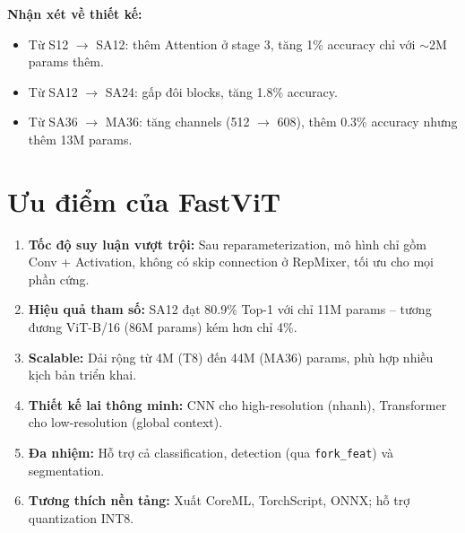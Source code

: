 \textbf{Nhận xét về thiết kế:}
\begin{itemize}
    \item Từ S12 $\to$ SA12: thêm Attention ở stage 3, tăng 1\% accuracy chỉ với $\sim$2M params thêm.
    \item Từ SA12 $\to$ SA24: gấp đôi blocks, tăng 1.8\% accuracy.
    \item Từ SA36 $\to$ MA36: tăng channels (512 $\to$ 608), thêm 0.3\% accuracy nhưng thêm 13M params.
\end{itemize}

\section{Ưu điểm của FastViT}
\label{sec:fastvit_advantages}

\begin{enumerate}
    \item \textbf{Tốc độ suy luận vượt trội:} Sau reparameterization, mô hình chỉ gồm Conv + Activation, không có skip connection ở RepMixer, tối ưu cho mọi phần cứng.
    
    \item \textbf{Hiệu quả tham số:} SA12 đạt 80.9\% Top-1 với chỉ 11M params -- tương đương ViT-B/16 (86M params) kém hơn chỉ 4\%.
    
    \item \textbf{Scalable:} Dải rộng từ 4M (T8) đến 44M (MA36) params, phù hợp nhiều kịch bản triển khai.
    
    \item \textbf{Thiết kế lai thông minh:} CNN cho high-resolution (nhanh), Transformer cho low-resolution (global context).
    
    \item \textbf{Đa nhiệm:} Hỗ trợ cả classification, detection (qua \texttt{fork\_feat}) và segmentation.
    
    \item \textbf{Tương thích nền tảng:} Xuất CoreML, TorchScript, ONNX; hỗ trợ quantization INT8.
\end{enumerate}
